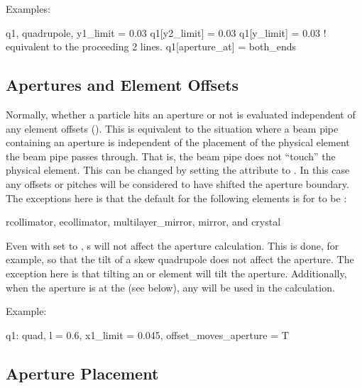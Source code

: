 Examples:
\begin{example}
  q1, quadrupole, y1_limit = 0.03
  q1[y2_limit] = 0.03
  q1[y_limit] = 0.03  ! equivalent to the proceeding 2 lines.  
  q1[aperture_at] = both_ends
\end{example}

\subsection{Apertures and Element Offsets}
\label{s:offset.ap}

Normally, whether a particle hits an aperture or not is evaluated independent of any element offsets
(). This is equivalent to the situation where a beam pipe containing an aperture is
independent of the placement of the physical element the beam pipe passes through. That is, the beam
pipe does not ``touch'' the physical element. This can be changed by setting the
 attribute to . In this case any offsets or pitches will be
considered to have shifted the aperture boundary. The exceptions here is that the default for the
following elements is for  to be :
\begin{example}
  rcollimator, 
  ecollimator,
  multilayer_mirror, 
  mirror, and 
  crystal 
\end{example}

Even with  set to , s will not affect the aperture
calculation. This is done, for example, so that the tilt of a skew quadrupole does not affect the
aperture. The exception here is that tilting an  or  element will
tilt the aperture. Additionally, when the aperture is at the  (see below), any 
will be used in the calculation.

Example:
\begin{example}
  q1: quad, l = 0.6, x1_limit = 0.045, offset_moves_aperture = T
\end{example}

\subsection{Aperture Placement}
\label{s:ap.place}


